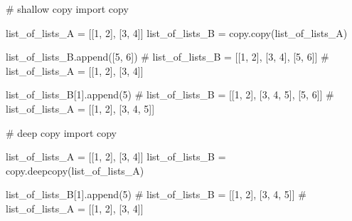 \documentclass[
  letterpaper,
]{book}
\newenvironment{Shaded}{\begin{snugshade}}{\end{snugshade}}
\newcommand{\CommentTok}[1]{\textcolor[rgb]{0.37,0.37,0.37}{#1}}
\newcommand{\DecValTok}[1]{\textcolor[rgb]{0.68,0.00,0.00}{#1}}
\newcommand{\ImportTok}[1]{\textcolor[rgb]{0.00,0.46,0.62}{#1}}
\newcommand{\NormalTok}[1]{\textcolor[rgb]{0.00,0.23,0.31}{#1}}
\newcommand{\OperatorTok}[1]{\textcolor[rgb]{0.37,0.37,0.37}{#1}}
\begin{document}
\begin{Shaded}
\begin{Highlighting}[]
\CommentTok{\#  shallow copy}
\ImportTok{import}\NormalTok{ copy}

\NormalTok{list\_of\_lists\_A }\OperatorTok{=}\NormalTok{ [[}\DecValTok{1}\NormalTok{, }\DecValTok{2}\NormalTok{], [}\DecValTok{3}\NormalTok{, }\DecValTok{4}\NormalTok{]]}
\NormalTok{list\_of\_lists\_B }\OperatorTok{=}\NormalTok{ copy.copy(list\_of\_lists\_A)}

\NormalTok{list\_of\_lists\_B.append([}\DecValTok{5}\NormalTok{, }\DecValTok{6}\NormalTok{])}
\CommentTok{\# list\_of\_lists\_B = [[1, 2], [3, 4], [5, 6]]}
\CommentTok{\# list\_of\_lists\_A = [[1, 2], [3, 4]]}

\NormalTok{list\_of\_lists\_B[}\DecValTok{1}\NormalTok{].append(}\DecValTok{5}\NormalTok{)}
\CommentTok{\# list\_of\_lists\_B = [[1, 2], [3, 4, 5], [5, 6]]}
\CommentTok{\# list\_of\_lists\_A = [[1, 2], [3, 4, 5]]}
\end{Highlighting}
\end{Shaded}

\begin{Shaded}
\begin{Highlighting}[]
\CommentTok{\# deep copy}
\ImportTok{import}\NormalTok{ copy}

\NormalTok{list\_of\_lists\_A }\OperatorTok{=}\NormalTok{ [[}\DecValTok{1}\NormalTok{, }\DecValTok{2}\NormalTok{], [}\DecValTok{3}\NormalTok{, }\DecValTok{4}\NormalTok{]]}
\NormalTok{list\_of\_lists\_B }\OperatorTok{=}\NormalTok{ copy.deepcopy(list\_of\_lists\_A)}

\NormalTok{list\_of\_lists\_B[}\DecValTok{1}\NormalTok{].append(}\DecValTok{5}\NormalTok{)}
\CommentTok{\# list\_of\_lists\_B = [[1, 2], [3, 4, 5]]}
\CommentTok{\# list\_of\_lists\_A = [[1, 2], [3, 4]]}
\end{Highlighting}
\end{Shaded}
\end{document}
